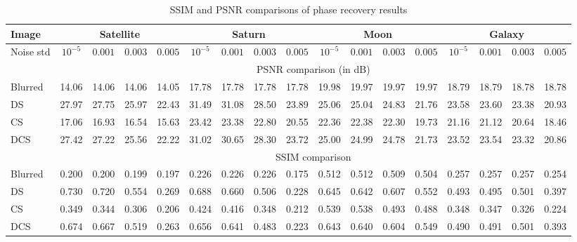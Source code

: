 \pdfoutput=1 \documentclass[journal]{IEEEtran}
\begin{document}
\begin{table*}[t]
\centering \caption{SSIM and PSNR comparisons of phase recovery
results}
\label{tab:denresults}
\begin{tabular}{l|cccc|cccc|cccc|cccc}
\hline
Image & \multicolumn{4}{c}{Satellite} & \multicolumn{4}{c}{Saturn} & \multicolumn{4}{c}{Moon} & \multicolumn{4}{c}{Galaxy}\\
\hline
Noise std & $10^{-5}$ & $0.001$ & $0.003$ & $0.005$ & $10^{-5}$ &  $0.001$ & $0.003$ & $0.005$  & $10^{-5}$ &  $0.001$ & $0.003$ & $0.005$  & $10^{-5}$ &  $0.001$ & $0.003$ & $0.005$ \\
\hline
& \multicolumn{16}{c}{PSNR comparison (in dB)}\\
\hline
Blurred               & 14.06 & 14.06 & 14.06 & 14.05 & 17.78 & 17.78 & 17.78 &  17.78 & 19.98 & 19.97 & 19.97 &  19.97 & 18.79 & 18.79 & 18.78 &  18.78\\
DS                & 27.97 & 27.75 & 25.97 & 22.43 & 31.49 & 31.08 & 28.50 &  23.89 & 25.06 & 25.04 & 24.83 &  21.76 & 23.58 & 23.60 & 23.38 &  20.93\\
CS                    & 17.06 & 16.93 & 16.54 & 15.63 & 23.42 & 23.38 & 22.80 &  20.55 & 22.36 & 22.38 & 22.30 &  19.73 & 21.16 & 21.12 & 20.64 & 18.46\\
DCS                   & 27.42 & 27.22 & 25.56 & 22.22 & 31.02 & 30.65 & 28.30 &  23.72 & 25.00 & 24.99 & 24.78 &  21.73 & 23.52 & 23.54 & 23.32 & 20.86\\
\hline
& \multicolumn{16}{c}{SSIM comparison}\\
\hline
Blurred               & 0.200 & 0.200 & 0.199 & 0.197 & 0.226 & 0.226 & 0.226 & 0.175 & 0.512 & 0.512 & 0.509 & 0.504 & 0.257 & 0.257 & 0.257 & 0.254\\
DS               & 0.730 & 0.720 & 0.554 & 0.269 & 0.688 & 0.660 & 0.506 & 0.228 & 0.645 & 0.642 & 0.607 & 0.552 & 0.493 & 0.495 & 0.501 & 0.397\\
CS                    & 0.349 & 0.344 & 0.306 & 0.206 & 0.424 & 0.416 & 0.348 & 0.212 & 0.539 & 0.538 & 0.493 & 0.488 & 0.348 & 0.347 & 0.326 & 0.224\\
DCS                   & 0.674 & 0.667 & 0.519 & 0.263 & 0.656 & 0.641 & 0.483 & 0.223 & 0.643 & 0.640 & 0.604 & 0.549 & 0.490 & 0.491 & 0.501 & 0.393\\
\hline
\end{tabular}
\end{table*}
\end{document}
